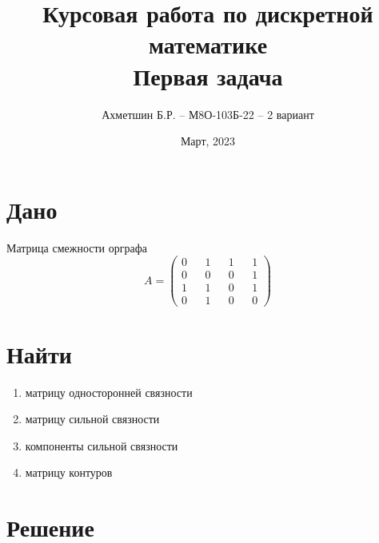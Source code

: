 \documentclass{article}
\title{Курсовая работа по дискретной математике\\Первая задача}
\author{Ахметшин Б.Р. -- М8О-103Б-22 -- 2 вариант}
\date{Март, 2023}
\begin{document}
\maketitle
               
\section*{Дано}
Матрица смежности орграфа
$$
A =
\begin{pmatrix}
  0 && 1 && 1 && 1 \\
  0 && 0 && 0 && 1 \\
  1 && 1 && 0 && 1 \\
  0 && 1 && 0 && 0
\end{pmatrix}
$$

\section*{Найти}
\begin{enumerate}
\item матрицу односторонней связности
\item матрицу сильной связности
\item компоненты сильной связности 
\item матрицу контуров
\end{enumerate}

\section*{Решение}
\end{document}
